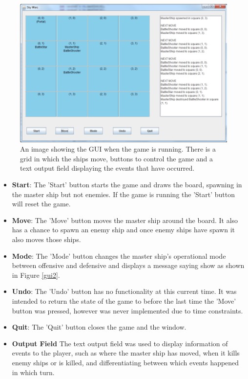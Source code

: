\documentclass[conference,backref=page]{acmsiggraph}
\begin{document}
\begin{figure}[h]
	\includegraphics[width=\columnwidth]{images/gui1.png}
	\caption{An image showing the GUI when the game is running. There is a grid in which the ships move, buttons to control the game and a text output field displaying the events that have occurred.}
	\label{gui1}
\end{figure}

\begin{itemize}
	\item {\bf Start}: The 'Start' button starts the game and draws the board, spawning in the master ship but not enemies. If the game is running the 'Start' button will reset the game.
	\item {\bf Move}: The 'Move' button moves the master ship around the board. It also has a chance to spawn an enemy ship and once enemy ships have spawn it also moves those ships.
	\item {\bf Mode}: The 'Mode' button changes the master ship's operational mode between offensive and defensive and displays a message saying show as shown in Figure \ref{gui2}.
	\item {\bf Undo}: The 'Undo' button has no functionality at this current time. It was intended to return the state of the game to before the last time the 'Move' button was pressed, however was never implemented due to time constraints.
	\item {\bf Quit}: The 'Quit' button closes the game and the window.
	\item{\bf Output Field} The text output field was used to display information of events to the player, such as where the master ship has moved, when it kills enemy ships or is killed, and differentiating between which events happened in which turn.
\end{itemize}
\end{document}
